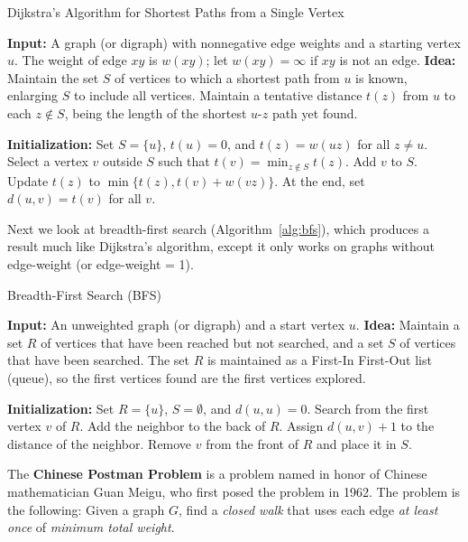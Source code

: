 \begin{algorithm}
	\caption{\label{alg:dijkstra}Dijkstra's Algorithm for Shortest Paths from a Single Vertex}
	\begin{algorithmic}[1]
		\STATE \textbf{Input:} A graph (or digraph) with nonnegative edge weights and a starting vertex $u$. The weight of edge $xy$ is $w(xy)$; let $w(xy) = \infty$ if $xy$ is not an edge.
		\STATE \textbf{Idea:} Maintain the set $S$ of vertices to which a shortest path from $u$ is known, enlarging $S$ to include all vertices. Maintain a tentative distance $t(z)$ from $u$ to each $z \notin S$, being the length of the shortest $u$-$z$ path yet found.

		\STATE \textbf{Initialization:} Set $S = \{u\}$, $t(u) = 0$, and $t(z) = w(uz)$ for all $z \neq u$.
		\STATE Select a vertex $v$ outside $S$ such that $t(v) = \min_{z \notin S} t(z)$.
		\STATE Add $v$ to $S$.
		\STATE Update $t(z)$ to $\min\{t(z), t(v) + w(vz)\}$.
		\ENDFOR
		\ENDWHILE
		\STATE At the end, set $d(u, v) = t(v)$ for all $v$.
	\end{algorithmic}
\end{algorithm}

Next we look at breadth-first search (Algorithm~\ref{alg:bfs}), which produces a result much like Dijkstra's algorithm, except it only works on graphs without edge-weight (or edge-weight = 1).

\begin{algorithm}
	\caption{\label{alg:bfs}Breadth-First Search (BFS)}
	\begin{algorithmic}[1]
		\STATE \textbf{Input:} An unweighted graph (or digraph) and a start vertex $u$.
		\STATE \textbf{Idea:} Maintain a set $R$ of vertices that have been reached but not searched, and a set $S$ of vertices that have been searched. The set $R$ is maintained as a First-In First-Out list (queue), so the first vertices found are the first vertices explored.

		\STATE \textbf{Initialization:} Set $R = \{u\}$, $S = \emptyset$, and $d(u, u) = 0$.
		\STATE Search from the first vertex $v$ of $R$.
		\STATE Add the neighbor to the back of $R$.
		\STATE Assign $d(u, v) + 1$ to the distance of the neighbor.
		\ENDFOR
		\STATE Remove $v$ from the front of $R$ and place it in $S$.
		\ENDWHILE
	\end{algorithmic}
\end{algorithm}

The \textbf{Chinese Postman Problem} is a problem named in honor of Chinese mathematician Guan Meigu, who first posed the problem in 1962. The problem is the following: Given a graph $G$, find a \textit{closed walk} that uses each edge \textit{at least once} of \textit{minimum total weight}.

